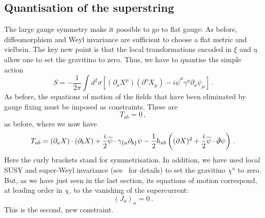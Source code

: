 \documentclass[12pt]{article}
\newcommand{\be}{\begin{equation}}
\newcommand{\ee}{\end{equation}}
\newcommand{\ol}{\overline}
\numberwithin{equation}{section}
\begin{document}
\subsection{Quantisation of the superstring}

The large gauge symmetry make it possible to go to flat gauge: As before, diffeomorphism and Weyl invariance are sufficient to choose a flat metric and vielbein. The key new point is that the local transformations encoded in $\xi$ and $\eta$ allow one to set the gravitino to zero. Thus, we have to quantise the simple action
\be
S=-\frac{1}{2\pi}\int d^2\sigma\left[(\partial_a X^\mu)(\partial^a X_\mu)-i\ol{\psi}^\mu\gamma^a\partial_a\psi_\mu\right]\,.
\ee
As before, the equations of motion of the fields that have been eliminated by gauge fixing must be imposed as constraints. These are 
\be
T_{ab}=0\,,
\ee
as before, where we now have
\be
T_{ab}=(\partial_a X)\cdot(\partial_b X)+\frac{i}{2}\ol{\psi}\cdot \gamma_{\{a} \partial_{b\}}\psi-\frac{1}{2}h_{ab}\left(
(\partial X)^2+\frac{i}{2}\ol{\psi}\cdot\slashed{\partial} \psi\right)\,.
\ee
Here the curly brackets stand for symmetrisation. In addition, we have used local SUSY and super-Weyl invariance (see~\cite{Blumenhagen:2013fgp} for details) to set the gravitino $\chi^a$ to zero. But, as we have just seen in the last section, its equations of motion correspond, at leading order in $\chi$, to the vanishing of the supercurrent:
\be
(J_a)_\alpha=0\,.
\ee
This is the second, new constraint. 
\end{document}
